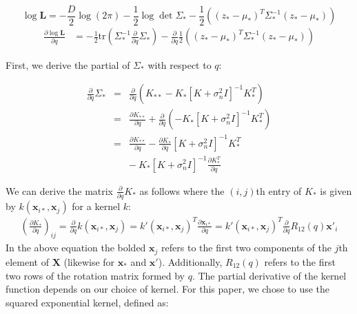 \documentclass{article} %
\begin{document}
\begin{equation}
\log \mathbf{L} = -\frac{D}{2} \log (2\pi) - \frac{1}{2} \log \det \Sigma_* - \frac{1}{2} \left((z_* - \mu_*)^T \Sigma_*^{-1} (z_* - \mu_*)\right)
\end{equation}
\begin{eqnarray}
\frac{\partial \log \mathbf{L}}{\partial q} &= - \frac{1}{2} \mbox{tr}(\Sigma_*^{-1} \frac{\partial}{\partial q} \Sigma_*)
                - \frac{\partial}{\partial q} \frac{1}{2} \left((z_* - \mu_*)^T \Sigma_*^{-1} (z_* - \mu_*)\right) 
\label{eq-partialq}
\end{eqnarray}

First, we derive the partial of $\Sigma_*$ with respect to $q$:

\begin{eqnarray}
\frac{\partial}{\partial q} \Sigma_* &=& \frac{\partial}{\partial q} (K_{**} - K_*[K + \sigma_n^2 I]^{-1} K_*^T) \nonumber\\
&=& \frac{\partial K_{**}}{\partial q} + \frac{\partial}{\partial q} (- K_*[K + \sigma_n^2 I]^{-1} K_*^T) \nonumber\\
&=& \frac{\partial K_{**}}{\partial q} - \frac{\partial K_*}{\partial q}  \left[K + \sigma_n^2 I\right]^{-1} K_*^T \nonumber\\
&&  - ~ K_* [K + \sigma_n^2 I]^{-1} \frac{\partial K_*^T}{\partial q}  \label{eq-covpartialq}
\end{eqnarray}
 

 We can derive the matrix $\frac{\partial}{\partial q} K_*$ as follows where the $(i,j)$th entry of $K_*$ is given by $k(\mathbf{x}_{i*}, \mathbf{x}_j)$ for a kernel $k$:
\begin{eqnarray}
\left(\frac{\partial K_*}{\partial q}\right)_{ij} = \frac{\partial}{\partial q} k(\mathbf{x}_{i*}, \mathbf{x}_j) = k'(\mathbf{x}_{i*}, \mathbf{x}_j)^T \frac{\partial \mathbf{x}_{i*}}{\partial q}  = k'(\mathbf{x}_{i*}, \mathbf{x}_j)^T \frac{\partial}{\partial q} R_{12}(q)\mathbf{x}'_i
\label{equation:partialKq}
\end{eqnarray}
In the above equation the bolded $\mathbf{x}_j$ refers to the first two components of the $j$th element of $\mathbf{X}$ (likewise for $\mathbf{x_*}$ and $\mathbf{x'}$). Additionally, $R_{12}(q)$ refers to the first two rows of the rotation matrix formed by $q$. The partial derivative of the kernel function depends on our choice of kernel. For this paper, we chose to use the squared exponential kernel, defined as:
\end{document}
